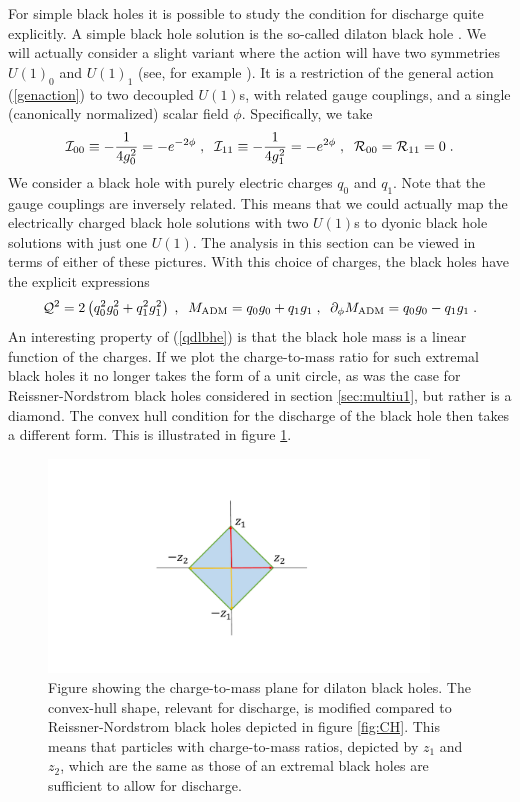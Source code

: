 \documentclass[11pt,a4paper]{article}
\numberwithin{equation}{section}
\numberwithin{table}{section}\setlength{\multlinegap}{25pt}
\newcommand{\be}{\begin{equation}}
\newcommand{\ee}{\end{equation}}
\begin{document}
For simple black holes it is possible to study the condition for discharge quite explicitly. A simple black hole solution is the so-called dilaton black hole \cite{Horowitz:1991cd}. We will actually consider a slight variant where the action will have two symmetries $U(1)_0$ and $U(1)_1$ (see, for example \cite{Freedman:2012zz}). It is a restriction of the general action (\ref{genaction}) to two decoupled $U(1)$s, with related gauge couplings, and a single (canonically normalized) scalar field $\phi$. Specifically, we take
\be
{\cal I}_{00} \equiv -\frac{1}{4g_0^2} = - e^{-2\phi} \;,\;\; {\cal I}_{11} \equiv -\frac{1}{4g_1^2} = -e^{2\phi} \;,\;\; {\cal R}_{00}={\cal R}_{11}=0 \;.
\ee
We consider a black hole with purely electric charges $q_0$ and $q_1$. Note that the gauge couplings are inversely related. This means that we could actually map the electrically charged black hole solutions with two $U(1)$s to dyonic black hole solutions with just one $U(1)$. The analysis in this section can be viewed in terms of either of these pictures. With this choice of charges, the black holes have the explicit expressions
\be
\label{qdlbhe}
{\cal Q}^2 = 2 \left( q_0^2 g_0^2 + q_1^2 g_1^2\right) \;,\;\; M_{\mathrm{ADM}} = q_0 g_0 + q_1 g_1 \;,\;\; \partial_{\phi} M_{\mathrm{ADM}} = q_0 g_0 - q_1 g_1\;.
\ee
An interesting property of (\ref{qdlbhe}) is that the black hole mass is a linear function of the charges. If we plot the charge-to-mass ratio for such extremal black holes it no longer takes the form of a unit circle, as was the case for Reissner-Nordstrom black holes considered in section \ref{sec:multiu1}, but rather is a diamond. The convex hull condition for the discharge of the black hole then takes a different form. This is illustrated in figure \ref{fig:CHdbh}. 
\begin{figure}[t]
\centering
 \includegraphics[width=0.9\textwidth]{FigCHdbh.pdf}
\caption{Figure showing the charge-to-mass plane for dilaton black holes. The convex-hull shape, relevant for discharge, is modified compared to Reissner-Nordstrom black holes depicted in figure \ref{fig:CH}. This means that particles with charge-to-mass ratios, depicted by $z_1$ and $z_2$, which are the same as those of an extremal black holes are sufficient to allow for discharge.}
\label{fig:CHdbh}
\end{figure}
\end{document}
